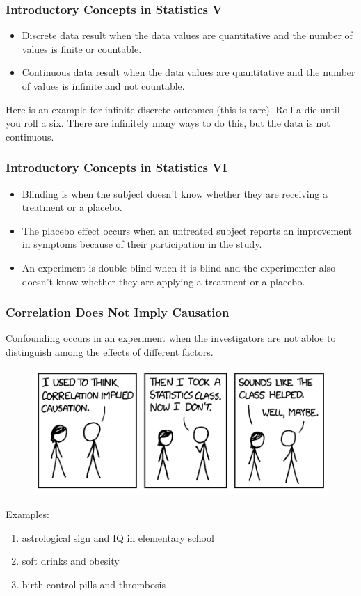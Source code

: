 \documentclass[xcolor=dvipsnames]{beamer}
\begin{document}
\begin{frame}
  \frametitle{Introductory Concepts in Statistics V}
  \begin{itemize}
  \item<1-> \alert{Discrete} data result when the data values are
    quantitative and the number of values is finite or countable.
  \item<2-> \alert{Continuous} data result when the data values are
    quantitative and the number of values is infinite and not
    countable.
  \end{itemize}
Here is an example for infinite discrete outcomes (this is rare). Roll
a die until you roll a six. There are infinitely many ways to do this,
but the data is not continuous.
\end{frame}

\begin{frame}
  \frametitle{Introductory Concepts in Statistics VI}
  \begin{itemize}
  \item<1-> \alert{Blinding} is when the subject doesn't know whether
    they are receiving a treatment or a placebo.
  \item<2-> The \alert{placebo effect} occurs when an untreated
    subject reports an improvement in symptoms because of their
    participation in the study.
  \item<3-> An experiment is \alert{double-blind} when it is blind and
    the experimenter also doesn't know whether they are applying a
    treatment or a placebo.
  \end{itemize}
\end{frame}

\begin{frame}
  \frametitle{Correlation Does Not Imply Causation}
\alert{Confounding} occurs in an experiment when the investigators are
not abloe to distinguish among the effects of different factors.
\begin{figure}[h]
\includegraphics[scale=.3]{./diagrams/xkcd-causation-correlation.png}
\end{figure}
Examples: 
\begin{enumerate}
\item<1-> astrological sign and IQ in elementary school
\item<2-> soft drinks and obesity
\item<3-> birth control pills and thrombosis
\end{enumerate}
\end{frame}
\end{document}
